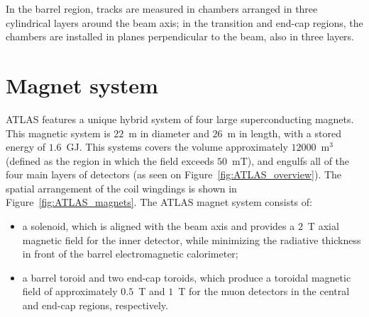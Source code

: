 In the barrel region, tracks are measured in chambers arranged in three cylindrical layers
around the beam axis; in the transition and end-cap regions, the chambers are installed in planes
perpendicular to the beam, also in three layers.


\section{Magnet system}
\label{sec:ATLAS_magnets}

\begin{figure}
\end{figure}


ATLAS features a unique hybrid system of four large superconducting magnets. This magnetic
system is $22$~m in diameter and $26$~m in length, with a stored energy of $1.6$~GJ. This systems covers the volume approximately $12000$~m$^3$ (defined as the region in which the field exceeds $50$~mT), and engulfs all of the four main layers of detectors (as seen on Figure~\ref{fig:ATLAS_overview}). The spatial arrangement of the coil wingdings is shown in Figure~\ref{fig:ATLAS_magnets}. The ATLAS magnet system consists of:

\begin{itemize}
\item a solenoid, which is aligned with the beam axis and provides a $2$~T axial magnetic field for the inner detector, while minimizing the radiative thickness in front of the
barrel electromagnetic calorimeter;
\item a barrel toroid and two end-cap toroids, which produce a
toroidal magnetic field of approximately $0.5$~T and $1$~T for the muon detectors in the central
and end-cap regions, respectively.
\end{itemize}

